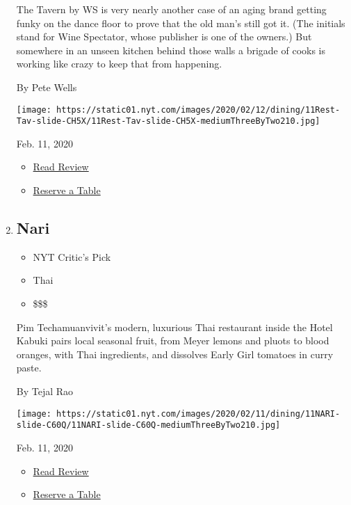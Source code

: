 \begin{enumerate}
  The Tavern by WS is very nearly another case of an aging brand getting
  funky on the dance floor to prove that the old man's still got it.
  (The initials stand for Wine Spectator, whose publisher is one of the
  owners.) But somewhere in an unseen kitchen behind those walls a
  brigade of cooks is working like crazy to keep that from happening.

  By Pete Wells

  \texttt{[image: https://static01.nyt.com/images/2020/02/12/dining/11Rest-Tav-slide-CH5X/11Rest-Tav-slide-CH5X-mediumThreeByTwo210.jpg]}

  Feb. 11, 2020

  \begin{itemize}
  \tightlist
  \item
    \href{https://www.nytimes.com/2020/02/11/dining/tavern-by-ws-review-pete-wells.html?rref=collection\%2Fcollection\%2Frestaurant-guide}{Read
    Review}
  \item
    \href{https://resy.com/cities/ny/tavern-by-ws?utm_source=nyt\&utm_medium=restoprofile\&utm_campaign=affiliates\&aff_id=c1fe784}{Reserve
    a Table}
  \end{itemize}
\item
  \href{https://www.nytimes.com/2020/02/11/dining/nari-review-tejal-rao.html}{}

  \hypertarget{nari}{%
  \subsection{Nari}\label{nari}}

  \begin{itemize}
  \tightlist
  \item
    NYT Critic's Pick
  \item
    Thai
  \item
    \$\$\$
  \end{itemize}

  Pim Techamuanvivit's modern, luxurious Thai restaurant inside the
  Hotel Kabuki pairs local seasonal fruit, from Meyer lemons and pluots
  to blood oranges, with Thai ingredients, and dissolves Early Girl
  tomatoes in curry paste.

  By Tejal Rao

  \texttt{[image: https://static01.nyt.com/images/2020/02/11/dining/11NARI-slide-C60Q/11NARI-slide-C60Q-mediumThreeByTwo210.jpg]}

  Feb. 11, 2020

  \begin{itemize}
  \tightlist
  \item
    \href{https://www.nytimes.com/2020/02/11/dining/nari-review-tejal-rao.html?rref=collection\%2Fcollection\%2Frestaurant-guide}{Read
    Review}
  \item
    \href{https://resy.com/cities/sf/nari?utm_source=nyt\&utm_medium=restoprofile\&utm_campaign=affiliates\&aff_id=c1fe784}{Reserve
    a Table}
  \end{itemize}
\end{enumerate}

